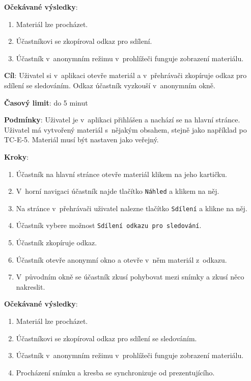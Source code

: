 \textbf{Očekávané výsledky}:

\begin{enumerate}[leftmargin=1.4cm]
    \item Materiál lze procházet.
    \item Účastníkovi se zkopíroval odkaz pro sdílení.
    \item Účastník v~anonymním režimu v~prohlížeči funguje zobrazení materiálu.
\end{enumerate}





\vspace{1em}

\textbf{Cíl}: Uživatel si v~aplikaci otevře materiál a v~přehrávači zkopíruje odkaz pro sdílení se sledováním. Odkaz účastník vyzkouší v~anonymním okně.

\textbf{Časový limit}: do 5 minut

\textbf{Podmínky}:  Uživatel je v~aplikaci přihlášen a nachází se na hlavní stránce.  Uživatel má vytvořený materiál s~nějakým obsahem, stejně jako například po TC-E-5. Materiál musí být nastaven jako veřejný.

\textbf{Kroky}:

\begin{enumerate}[leftmargin=1.4cm]
    \item Účastník na hlavní stránce otevře materiál klikem na jeho kartičku.
    \item V~horní navigaci účastník najde tlačítko \verb|Náhled| a klikem na něj.
    \item Na stránce v~přehrávači uživatel nalezne tlačítko \verb|Sdílení| a klikne na něj.
    \item Účastník vybere možnost \verb|Sdílení odkazu pro sledování|.
    \item Účastník zkopíruje odkaz.
    \item Účastník otevře anonymní okno a otevře v~něm materiál z~odkazu.
    \item V~původním okně se účastník zkusí pohybovat mezi snímky a zkusí něco nakreslit. 
\end{enumerate}

\textbf{Očekávané výsledky}:

\begin{enumerate}[leftmargin=1.4cm]
    \item Materiál lze procházet.
    \item Účastníkovi se zkopíroval odkaz pro sdílení se sledováním.
    \item Účastník v~anonymním režimu v~prohlížeči funguje zobrazení materiálu.
    \item Procházení snímku a kresba se synchronizuje od prezentujícího.
\end{enumerate}




